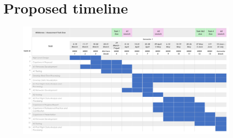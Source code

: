\renewcommand{\thechapter}{\Alph{chapter}}
\renewcommand{\thefigure}{\Alph{chapter}.\arabic{figure}}
\renewcommand{\chaptername}{Appendix}

\clearpage
\chapter{Proposed timeline}\label{apdx:gantt}
\setlrmarginsandblock{0.5cm}{0.5cm}{*}
\checkandfixthelayout
\vfill{}
\begin{figure}[h]
  \begin{center}
    \includegraphics[width=\textwidth]{./img/gantt.png}
  \end{center}
\end{figure}
\vfill{}
